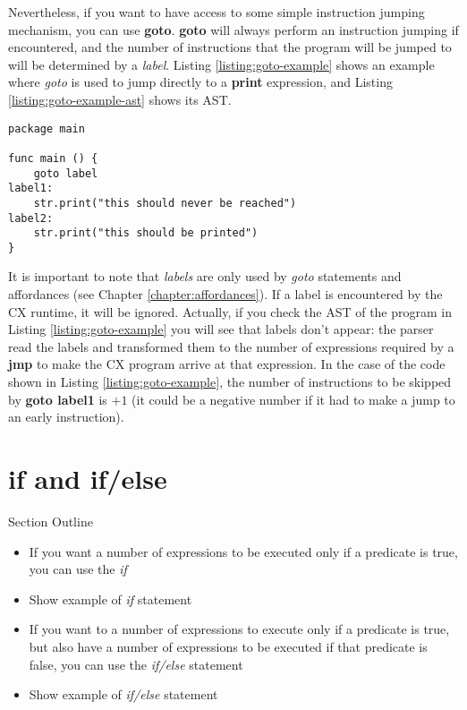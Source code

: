 \documentclass[11pt,fleqn,openany]{book} %
\begin{document}
Nevertheless, if you want to have access to some simple instruction jumping mechanism, you can use \textbf{goto}. \textbf{goto} will always perform an instruction jumping if encountered, and the number of instructions that the program will be jumped to will be determined by a \emph{label}. Listing \ref{listing:goto-example} shows an example where \emph{goto} is used to jump directly to a \textbf{print} expression, and Listing \ref{listing:goto-example-ast} shows its AST.

\begin{lstlisting}[caption={Using $goto$ for Control Flow},captionpos=b,label={listing:goto-example}]
package main

func main () {
	goto label
label1:
	str.print("this should never be reached")
label2:
	str.print("this should be printed")
}
\end{lstlisting}

It is important to note that \emph{labels} are only used by \emph{goto} statements and affordances (see Chapter \ref{chapter:affordances}). If a label is encountered by the CX runtime, it will be ignored. Actually, if you check the AST of the program in Listing \ref{listing:goto-example} you will see that labels don't appear: the parser read the labels and transformed them to the number of expressions required by a \textbf{jmp} to make the CX program arrive at that expression. In the case of the code shown in Listing \ref{listing:goto-example}, the number of instructions to be skipped by \textbf{goto label1} is $+1$ (it could be a negative number if it had to make a jump to an early instruction).

\section{if and if/else}

\begin{remark}
Section Outline
    \begin{itemize}
    	\item If you want a number of expressions to be executed only if a predicate is true, you can use the \textit{if}
        \item Show example of \textit{if} statement
        \item If you want to a number of expressions to execute only if a predicate is true, but also have a number of expressions to be executed if that predicate is false, you can use the \textit{if/else} statement
        \item Show example of \textit{if/else} statement
    \end{itemize}
\end{remark}
\end{document}

